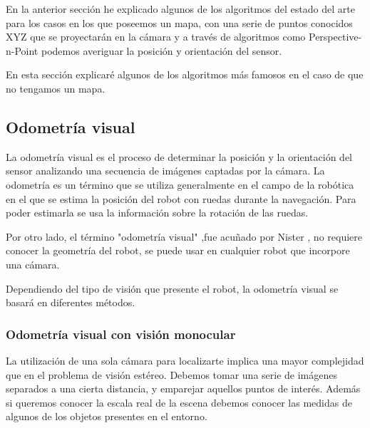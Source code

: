 \documentclass{bmvc2k}
\begin{document}
En la anterior sección he explicado algunos de los algoritmos del estado del arte para los casos en los que poseemos un mapa, con una serie de puntos conocidos XYZ que se proyectarán en la cámara y a través de algoritmos como Perspective-n-Point podemos averiguar la posición y orientación del sensor.



En esta sección explicaré algunos de los algoritmos más famosos en el caso de que no tengamos un mapa.

\subsection{Odometría visual}

La odometría visual es el proceso de determinar la posición y la orientación del sensor analizando una secuencia de imágenes captadas por la cámara. La odometría es un término que se utiliza generalmente en el campo de la robótica en el que se estima la posición del robot con ruedas durante la navegación. Para poder estimarla se usa la información sobre la rotación de las ruedas.

Por otro lado, el término "odometría visual" ,fue acuñado por Nister \cite{odometriavisual}, no requiere conocer la geometría del robot, se puede usar en cualquier robot que incorpore una cámara.

Dependiendo del tipo de visión que presente el robot, la odometría visual se basará en diferentes métodos.

\subsubsection{Odometría visual con visión monocular}
La utilización de una sola cámara para localizarte implica una mayor complejidad que en el problema de visión estéreo. Debemos tomar una serie de imágenes separados a una cierta distancia, y emparejar aquellos puntos de interés. Además si queremos conocer la escala real de la escena debemos conocer las medidas de algunos de los objetos presentes en el entorno.
\end{document}
